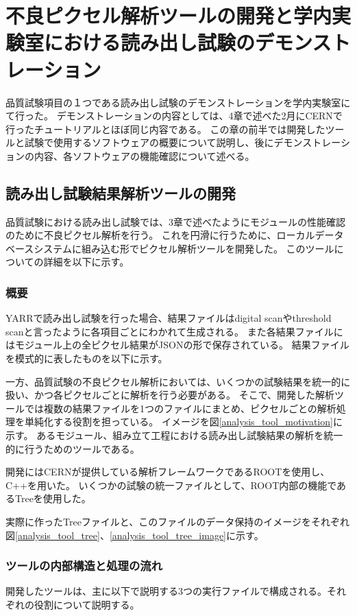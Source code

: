 \chapter{不良ピクセル解析ツールの開発と学内実験室における読み出し試験のデモンストレーション}
品質試験項目の１つである読み出し試験のデモンストレーションを学内実験室にて行った。
デモンストレーションの内容としては、4章で述べた2月にCERNで行ったチュートリアルとほぼ同じ内容である。
この章の前半では開発したツールと試験で使用するソフトウェアの概要について説明し、後にデモンストレーションの内容、各ソフトウェアの機能確認について述べる。


\section{読み出し試験結果解析ツールの開発}
品質試験における読み出し試験では、3章で述べたようにモジュールの性能確認のために不良ピクセル解析を行う。
これを円滑に行うために、ローカルデータベースシステムに組み込む形でピクセル解析ツールを開発した。
このツールについての詳細を以下に示す。

\subsection{概要}
YARRで読み出し試験を行った場合、結果ファイルはdigital scanやthreshold scanと言ったように各項目ごとにわかれて生成される。
また各結果ファイルにはモジュール上の全ピクセル結果がJSONの形で保存されている。
結果ファイルを模式的に表したものを以下に示す。

一方、品質試験の不良ピクセル解析においては、いくつかの試験結果を統一的に扱い、かつ各ピクセルごとに解析を行う必要がある。
そこで、開発した解析ツールでは複数の結果ファイルを1つのファイルにまとめ、ピクセルごとの解析処理を単純化する役割を担っている。
イメージを図\ref{analysis_tool_motivation}に示す。
あるモジュール、組み立て工程における読み出し試験結果の解析を統一的に行うためのツールである。

開発にはCERNが提供している解析フレームワークであるROOTを使用し、C++を用いた。
いくつかの試験の統一ファイルとして、ROOT内部の機能であるTreeを使用した。

実際に作ったTreeファイルと、このファイルのデータ保持のイメージをそれぞれ図\ref{analysis_tool_tree}、\ref{analysis_tool_tree_image}に示す。


\subsection{ツールの内部構造と処理の流れ}
開発したツールは、主に以下で説明する3つの実行ファイルで構成される。それぞれの役割について説明する。

